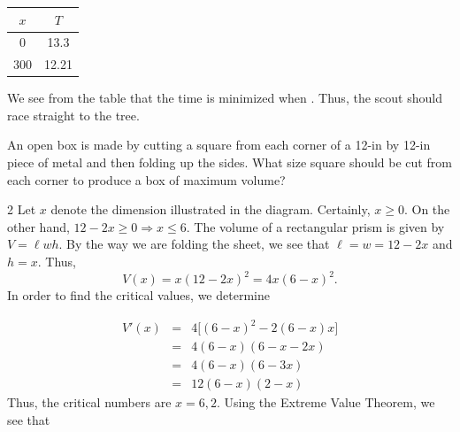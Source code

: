 \documentclass{book}
\begin{document}
\begin{Exam}
\begin{center}
\begin{tabular}{c|c}

$x$ & $T$ \\ \hline
0 & 13.3 \\ 
300 & 12.21 \\ 
\end{tabular}
\end{center} We see from the table that the time is minimized when . Thus, the scout should race straight to the tree.
\end{Exam}\vs

\begin{Exam} An open box is made by cutting a square from each corner of a 12-in by 12-in piece of metal and then folding up the sides. What size square should be cut from each corner to produce a box of maximum volume?
\begin{multicols}{2}
Let $x$ denote the dimension illustrated in the diagram. Certainly, $x \ge 0$. On the other hand, $12-2x \ge 0 \Rightarrow x \le 6$. The volume of a rectangular prism is given by $V = \ell wh$. By the way we are folding the sheet, we see that $\ell = w = 12-2x$ and $h = x$. Thus,
\[V(x) = x(12-2x)^2 = 4x(6-x)^2.\] In order to find the critical values, we determine 
\begin{center}
\end{center}
\end{multicols}\vspace{-15pt}

 \begin{eqnarray*} V'(x) &=& 4\big[(6-x)^2 -2(6-x)x\big]\\ &=& 4(6-x)(6-x - 2x)\\ &=& 4(6-x)(6-3x)\\ &=& 12(6-x)(2-x)\end{eqnarray*} Thus, the critical numbers are $x = 6, 2$. Using the Extreme Value Theorem, we see that \vspace{-10pt}


\end{Exam}
\end{document}

